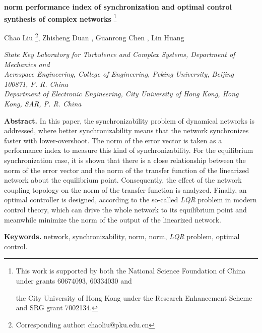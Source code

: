 \documentclass[11pt]{article}
\begin{document}
\begin{center}
{{\Large \bf  norm performance index of synchronization and
optimal control synthesis of complex networks}}
 \footnote{{\footnotesize This work is supported by both the National Science
 Foundation of China under grants 60674093, 60334030 and

\quad the City University of Hong Kong under the Research
Enhancement Scheme and SRG grant 7002134. }}
\end{center}
\vskip 0.3cm
\begin{center}
  Chao Liu  \footnote{
{\footnotesize Corresponding author: chaoliu@pku.edu.cn}},
    \quad Zhisheng Duan ,
    \quad Guanrong Chen ,
    \quad Lin Huang 
\end{center}
\begin{center}
{\small \it   State Key Laboratory for Turbulence and
Complex Systems, Department of Mechanics and \\Aerospace
Engineering, College of Engineering, Peking University, Beijing
100871, P. R. China
\\  Department of Electronic Engineering, City University of Hong Kong, Hong Kong, SAR, P. R. China}
\end{center}

\vspace*{1\baselineskip}
\begin{center}
{\begin{minipage}{127mm} {\small {\bf Abstract.} In this paper, the
synchronizability problem of dynamical networks is addressed, where
better synchronizability means that the network synchronizes faster
with lower-overshoot. The  norm of the error vector  is
taken as a performance index to measure this kind of
synchronizability. For the equilibrium synchronization case, it is
shown that there is a close relationship between the  norm of
the error vector  and the  norm of the transfer function 
of the linearized network about the equilibrium point. Consequently,
the effect of the network coupling topology on the  norm of the
transfer function  is analyzed. Finally, an optimal controller is
designed, according to the so-called \textit{LQR} problem in modern
control theory, which can drive the whole network to its equilibrium
point and meanwhile minimize the  norm of the output of the
linearized network. }

\vspace*{0.5\baselineskip} {{\bf Keywords.} network,
 synchronizability,  norm,  norm, \textit{LQR} problem, optimal control.}

\end{minipage}
}
\end{center}
\end{document}
